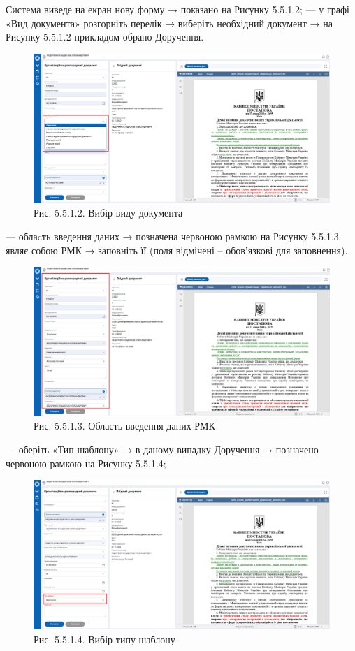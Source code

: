 Система виведе на екран нову форму → показано на Рисунку 5.5.1.2;
--- у графі «Вид документа» розгорніть перелік → виберіть необхідний
документ → на Рисунку 5.5.1.2 прикладом обрано Доручення.

\begin{figure}[!htbp]
\centerline{\includegraphics[width=\textwidth]{img/5.5.1.2.png}}
\caption{Рис. 5.5.1.2. Вибір виду документа}
\end{figure}

--- облаcть введення даних → позначена червоною рамкою на Рисунку 5.5.1.3
являє собою РМК → заповніть її (поля відмічені \circled{$\ast$} – обов’язкові для
заповнення).

\begin{figure}[!htbp]
\centerline{\includegraphics[width=\textwidth]{img/5.5.1.3.png}}
\caption{Рис. 5.5.1.3. Область введення даних РМК}
\end{figure}

--- оберіть «Тип шаблону» → в даному випадку Доручення → позначено
червоною рамкою на Рисунку 5.5.1.4;

\begin{figure}[!htbp]
\centerline{\includegraphics[width=\textwidth]{img/5.5.1.4.png}}
\caption{Рис. 5.5.1.4. Вибір типу шаблону}
\end{figure}

